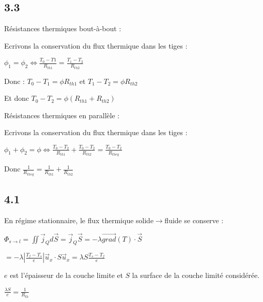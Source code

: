 \documentclass[a4paper,12pt]{book}
\begin{document}
\subsection{3.3}
Résistances thermiques bout-à-bout : \par Ecrivons la conservation du flux thermique dans les tiges : \par $\phi_1=\phi_2 \Leftrightarrow \frac{T_0-T1}{R_{th1}} = \frac{T_1-T_2}{R_{th2}}$ \par Donc : $T_0-T_1  =\phi R_{th1}$ et $T_1-T_2 = \phi R_{th2}$ \par Et donc $T_0-T_2 = \phi(R_{th1}+R_{th2})$

\par Résistances thermiques en parallèle : \par Ecrivons la conservation du flux thermique dans les tiges : \par $\phi_1+\phi_2=\phi \Leftrightarrow \frac{T_0-T_2}{R_{th1}}+\frac{T_0-T_2}{R_{th2}}=\frac{T_0-T_2}{R_{theq}}$ \par Donc $\frac{1}{R_{theq}} = \frac{1}{R_{th1}}+\frac{1}{R_{th2}}$

\subsection{4.1}
En régime stationnaire, le flux thermique solide$\to$fluide se conserve : \par $\Phi_{s\to l}=\iint\vec{j}_Qd\vec{S} = \vec{j}_Q\vec{S} = -\lambda\vec{grad}(T)\cdot\vec{S}$ \par $ = -\lambda\left\vert\frac{T_f-T_s}{e}\right\vert\vec{u}_x\cdot S\vec{u}_x =\lambda S\frac{T_s-T_f}{e}$ \par $e$ est l'épaisseur de la couche limite et $S$ la surface de la couche limité considérée. \par $\frac{\lambda S}{e}=\frac{1}{R_{th}}$
\end{document}
